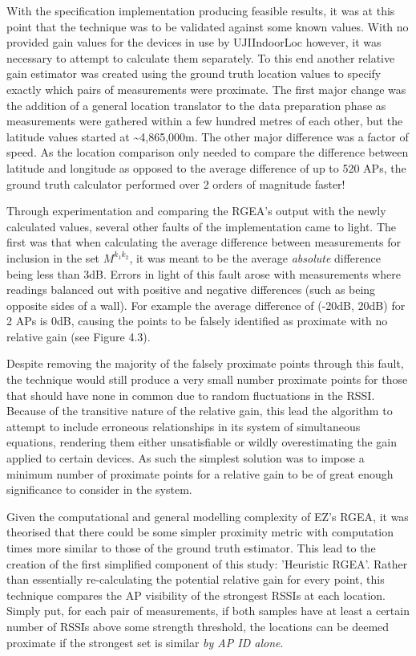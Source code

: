 \documentclass{UoYCSproject}
\begin{document}
            With the specification implementation producing feasible results, it was at this point that the technique was to be validated against some known values. With no provided gain values for the devices in use by UJIIndoorLoc however, it was necessary to attempt to calculate them separately. To this end another relative gain estimator was created using the ground truth location values to specify exactly which pairs of measurements were proximate. The first major change was the addition of a general location translator to the data preparation phase as measurements were gathered within a few hundred metres of each other, but the latitude values started at \textasciitilde4,865,000m. The other major difference was a factor of speed. As the location comparison only needed to compare the difference between latitude and longitude as opposed to the average difference of up to 520 APs, the ground truth calculator performed over 2 orders of magnitude faster!
            
            Through experimentation and comparing the RGEA's output with the newly calculated values, several other faults of the implementation came to light. The first was that when calculating the average difference between measurements for inclusion in the set $M^{k_1k_2}$, it was meant to be the average \emph{absolute} difference being less than 3dB. Errors in light of this fault arose with measurements where readings balanced out with positive and negative differences (such as being opposite sides of a wall). For example the average difference of (-20dB, 20dB) for 2 APs is $0$dB, causing the points to be falsely identified as proximate with no relative gain (see Figure 4.3).
            
            Despite removing the majority of the falsely proximate points through this fault, the technique would still produce a very small number proximate points for those that should have none in common due to random fluctuations in the RSSI. Because of the transitive nature of the relative gain, this lead the algorithm to attempt to include erroneous relationships in its system of simultaneous equations, rendering them either unsatisfiable or wildly overestimating the gain applied to certain devices. As such the simplest solution was to impose a minimum number of proximate points for a relative gain to be of great enough significance to consider in the system.
            
            Given the computational and general modelling complexity of EZ's RGEA, it was theorised that there could be some simpler proximity metric with computation times more similar to those of the ground truth estimator. This lead to the creation of the first simplified component of this study: 'Heuristic RGEA'. Rather than essentially re-calculating the potential relative gain for every point, this technique compares the AP visibility of the strongest RSSIs at each location. Simply put, for each pair of measurements, if both samples have at least a certain number of RSSIs above some strength threshold, the locations can be deemed proximate if the strongest set is similar \emph{by AP ID alone}.
            
\end{document}
